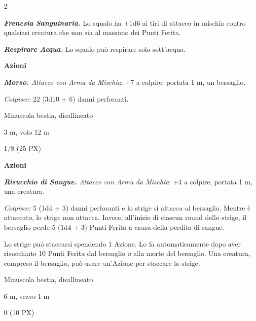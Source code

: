 \begin{multicols}{2}
{\emph{\textbf{Frenesia Sanguinaria.}} Lo squalo ha +1d6 ai tiri di attacco in mischia contro qualsiasi creatura che non sia al massimo dei Punti Ferita.

\emph{\textbf{Respirare Acqua.}} Lo squalo può respirare solo sott'acqua.

\textbf{Azioni}

\emph{\textbf{Morso.} Attacco con Arma da Mischia}: +7 a colpire, portata 1 m, un bersaglio.

\emph{Colpisce:} 22 (3d10 + 6) danni perforanti.

\begin{description}[noitemsep, topsep=0pt, parsep=0pt, partopsep=0pt, itemsep=1pt, leftmargin=2.35cm,  labelwidth=2.2cm, itemindent=0cm, listparindent=0pt] %
\setlength{\baselineskip}{10pt}
\item[\textbf{Taglia/Tipo}] Minuscola bestia, disallineato
\item[\textbf{Caratt.}] 
\item[\textbf{Punti Ferita}] 
\item[\textbf{Tiri Salvez.}] 
\item[\textbf{Movimento}] 3 m, volo 12 m
\item[\textbf{Sfida}] 1/8 (25 PX)
\end{description}
\smallskip

\textbf{Azioni}

\emph{\textbf{Risucchio di Sangue.} Attacco con Arma da Mischia}: +4 a colpire, portata 1 m, una creatura.

\emph{Colpisce:} 5 (1d4 + 3) danni perforanti e lo strige si attacca al bersaglio. Mentre è attaccato, lo strige non attacca. Invece, all'inizio di ciascun round dello strige, il bersaglio perde 5 (1d4 + 3) Punti Ferita a causa della perdita di sangue.

Lo strige può staccarsi spendendo 1 Azione. Lo fa automaticamente dopo aver risucchiato 10 Punti Ferita dal bersaglio o alla morte del bersaglio. Una creatura, compreso il bersaglio, può usare un'Azione per staccare lo strige.

\begin{description}[noitemsep, topsep=0pt, parsep=0pt, partopsep=0pt, itemsep=1pt, leftmargin=2.35cm,  labelwidth=2.2cm, itemindent=0cm, listparindent=0pt] %
\setlength{\baselineskip}{10pt}
\item[\textbf{Taglia/Tipo}] Minuscola bestia, disallineato
\item[\textbf{Caratt.}] 
\item[\textbf{Punti Ferita}] 
\item[\textbf{Tiri Salvez.}] 
\item[\textbf{Movimento}] 6 m, scavo 1 m
\item[\textbf{Sfida}] 0 (10 PX)
\end{description}
\smallskip

}
\end{multicols}
